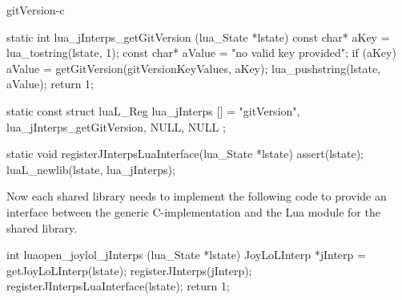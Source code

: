 \stopTestCase
\stopTestSuite

\component gitVersion-c

\startCCode
static int lua_jInterps_getGitVersion (lua_State *lstate) {
  const char* aKey   = lua_tostring(lstate, 1);
  const char* aValue = "no valid key provided";
  if (aKey) aValue = getGitVersion(gitVersionKeyValues, aKey);
  lua_pushstring(lstate, aValue);
  return 1;
}
\stopCCode

\startCCode
static const struct luaL_Reg lua_jInterps [] = {
  {"gitVersion", lua_jInterps_getGitVersion},
  {NULL, NULL}
};
\stopCCode

\startCCode
static void registerJInterpsLuaInterface(lua_State *lstate) {
  assert(lstate);
  luaL_newlib(lstate, lua_jInterps);
}
\stopCCode

Now each shared library needs to implement the following code to provide 
an interface between the generic C-implementation and the Lua module for 
the shared library. 

\startCCode
int luaopen_joylol_jInterps (lua_State *lstate) {
  JoyLoLInterp *jInterp = getJoyLoLInterp(lstate);
  registerJInterps(jInterp);
  registerJInterpsLuaInterface(lstate);
  return 1;
}
\stopCCode